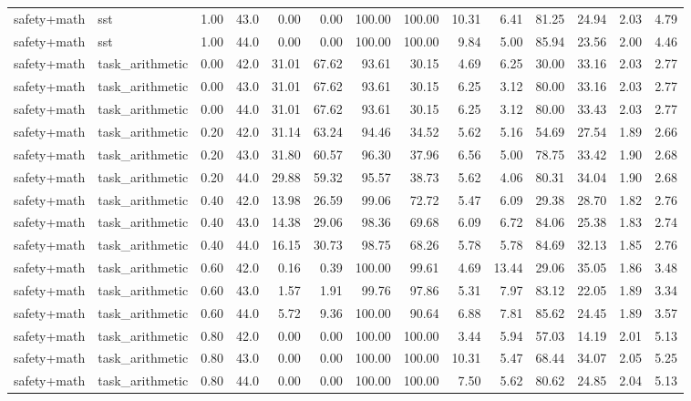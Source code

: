 \documentclass{article}
\begin{document}
\begin{table}[H]
{\begin{tabular}{llllrrrrrrrrrr}
safety+math & sst & 1.00 & 43.0 & 0.00 & 0.00 & 100.00 & 100.00 & 10.31 & 6.41 & 81.25 & 24.94 & 2.03 & 4.79 \\
safety+math & sst & 1.00 & 44.0 & 0.00 & 0.00 & 100.00 & 100.00 & 9.84 & 5.00 & 85.94 & 23.56 & 2.00 & 4.46 \\
safety+math & task\_arithmetic & 0.00 & 42.0 & 31.01 & 67.62 & 93.61 & 30.15 & 4.69 & 6.25 & 30.00 & 33.16 & 2.03 & 2.77 \\
safety+math & task\_arithmetic & 0.00 & 43.0 & 31.01 & 67.62 & 93.61 & 30.15 & 6.25 & 3.12 & 80.00 & 33.16 & 2.03 & 2.77 \\
safety+math & task\_arithmetic & 0.00 & 44.0 & 31.01 & 67.62 & 93.61 & 30.15 & 6.25 & 3.12 & 80.00 & 33.43 & 2.03 & 2.77 \\
safety+math & task\_arithmetic & 0.20 & 42.0 & 31.14 & 63.24 & 94.46 & 34.52 & 5.62 & 5.16 & 54.69 & 27.54 & 1.89 & 2.66 \\
safety+math & task\_arithmetic & 0.20 & 43.0 & 31.80 & 60.57 & 96.30 & 37.96 & 6.56 & 5.00 & 78.75 & 33.42 & 1.90 & 2.68 \\
safety+math & task\_arithmetic & 0.20 & 44.0 & 29.88 & 59.32 & 95.57 & 38.73 & 5.62 & 4.06 & 80.31 & 34.04 & 1.90 & 2.68 \\
safety+math & task\_arithmetic & 0.40 & 42.0 & 13.98 & 26.59 & 99.06 & 72.72 & 5.47 & 6.09 & 29.38 & 28.70 & 1.82 & 2.76 \\
safety+math & task\_arithmetic & 0.40 & 43.0 & 14.38 & 29.06 & 98.36 & 69.68 & 6.09 & 6.72 & 84.06 & 25.38 & 1.83 & 2.74 \\
safety+math & task\_arithmetic & 0.40 & 44.0 & 16.15 & 30.73 & 98.75 & 68.26 & 5.78 & 5.78 & 84.69 & 32.13 & 1.85 & 2.76 \\
safety+math & task\_arithmetic & 0.60 & 42.0 & 0.16 & 0.39 & 100.00 & 99.61 & 4.69 & 13.44 & 29.06 & 35.05 & 1.86 & 3.48 \\
safety+math & task\_arithmetic & 0.60 & 43.0 & 1.57 & 1.91 & 99.76 & 97.86 & 5.31 & 7.97 & 83.12 & 22.05 & 1.89 & 3.34 \\
safety+math & task\_arithmetic & 0.60 & 44.0 & 5.72 & 9.36 & 100.00 & 90.64 & 6.88 & 7.81 & 85.62 & 24.45 & 1.89 & 3.57 \\
safety+math & task\_arithmetic & 0.80 & 42.0 & 0.00 & 0.00 & 100.00 & 100.00 & 3.44 & 5.94 & 57.03 & 14.19 & 2.01 & 5.13 \\
safety+math & task\_arithmetic & 0.80 & 43.0 & 0.00 & 0.00 & 100.00 & 100.00 & 10.31 & 5.47 & 68.44 & 34.07 & 2.05 & 5.25 \\
safety+math & task\_arithmetic & 0.80 & 44.0 & 0.00 & 0.00 & 100.00 & 100.00 & 7.50 & 5.62 & 80.62 & 24.85 & 2.04 & 5.13 \\

\end{tabular}}
\end{table}
\end{document}
